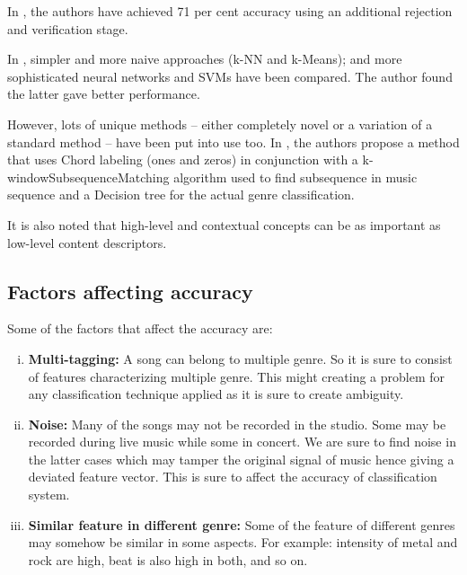 In \cite{Koerich2013}, the authors have achieved 71 per cent accuracy using an additional rejection and verification stage.

In \cite{Haggblade2011}, simpler and more naive approaches (k-NN and k-Means); and more sophisticated neural networks and SVMs have been compared. The
author found the latter gave better performance.

However, lots of unique methods -- either completely novel or a variation of a standard method -- have been put into use too. In \cite{Nasridinov2014}, the authors
propose a method that uses Chord labeling (ones and zeros) in conjunction with a k-windowSubsequenceMatching algorithm used to find subsequence in music sequence
and a Decision tree for the actual genre classification.

It is also noted that high-level and contextual concepts can be as important as low-level content descriptors. \cite{Anglade2010} 

\subsection{Factors affecting accuracy}
Some of the factors that affect the accuracy are: 
\begin{enumerate}[(i)] 
        \item \textbf{Multi-tagging:} A song can belong to multiple genre. So it is sure to consist of features characterizing multiple genre. This might creating a
                problem for any classification technique applied as it is sure to create ambiguity. 
        \item \textbf{Noise:} Many of the songs may not be recorded in the studio. Some may be recorded during live music while some in concert. We are sure to find
                noise in the latter cases which may tamper the original signal of music hence giving a deviated feature vector. This is sure to affect the accuracy of classification system.
        \item \textbf{Similar feature in different genre:} Some of the feature of different genres may somehow be similar in some aspects. For example: intensity of metal
                and rock are high, beat is also high in both, and so on. 
\end{enumerate}
